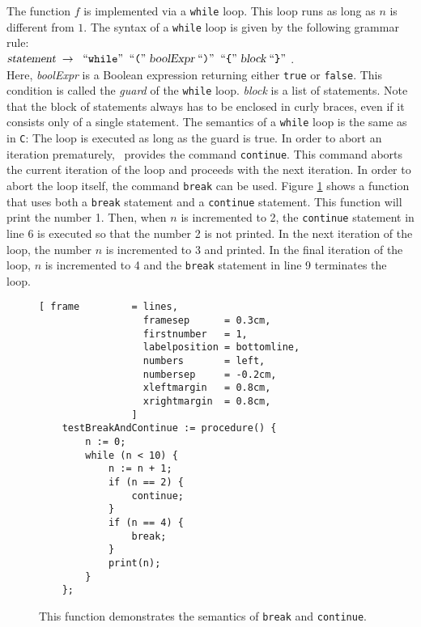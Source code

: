 The function $f$ is implemented via a \texttt{while} loop.  This loop runs as long as $n$
is different from $1$.  The syntax of a \texttt{while} loop is given by the following
grammar rule:
\\[0.2cm]
\hspace*{1.3cm}
$\textsl{statement} \;\rightarrow\; \;\mbox{``\texttt{while}''}\; \;\mbox{``\texttt{(}''}\; \textsl{boolExpr} \;\mbox{``\texttt{)}''}\;
 \;\mbox{``\texttt{\{}''}\;  \textsl{block} \;\mbox{``\texttt{\}}''}\; 
$.
\\[0.2cm]
Here, \textsl{boolExpr} is a Boolean expression returning either \texttt{true} or
\texttt{false}.  This condition is called the \emph{guard} of the \texttt{while} loop.
\textsl{block} is a list of statements.  Note that the
block of statements always has to be enclosed in curly braces, even if it consists only of a
single statement.  The semantics of a \texttt{while} loop is the same as in \texttt{C}:
The loop is executed as long as the guard is true.  In order to abort an iteration
prematurely, \setlx\ provides the command \texttt{continue}.  This command aborts the
current iteration of the loop and proceeds with the next iteration.  In order to abort the
loop itself, the command \texttt{break} can be used.  Figure \ref{fig:break-and-continue.stlx} shows
a function that uses both a \texttt{break} statement and a \texttt{continue} statement.  This
function will print the number 1.  Then, when $n$ is incremented to 2, the \texttt{continue}
statement in line 6 is executed so that the number 2 is not printed.  In the next iteration of the
loop, the number $n$ is incremented to 3 and printed.  In the final iteration of the loop, $n$ is
incremented to 4 and the \texttt{break} statement in line 9 terminates the loop.


\begin{figure}[!ht]
\centering
\begin{Verbatim}[ frame         = lines, 
                  framesep      = 0.3cm, 
                  firstnumber   = 1,
                  labelposition = bottomline,
                  numbers       = left,
                  numbersep     = -0.2cm,
                  xleftmargin   = 0.8cm,
                  xrightmargin  = 0.8cm,
                ]
    testBreakAndContinue := procedure() {
        n := 0;
        while (n < 10) {
            n := n + 1;
            if (n == 2) {
                continue;
            }
            if (n == 4) {
                break;
            }
            print(n);
        }
    };
\end{Verbatim}
\vspace*{-0.3cm}
\caption{This function demonstrates the semantics of \texttt{break} and \texttt{continue}.}
\label{fig:break-and-continue.stlx}
\end{figure}

